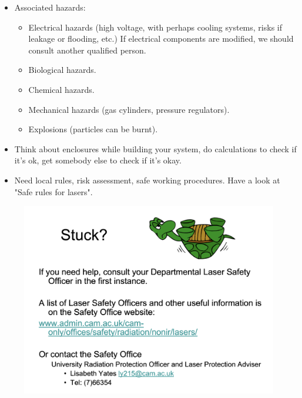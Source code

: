 \documentclass[a4paper,11pt]{article}
\begin{document}
\begin{itemize}
\begin{itemize}
\end{itemize}
\item Associated hazards: 
\begin{itemize}
	\item Electrical hazards (high voltage, with perhaps cooling systems, risks if leakage or flooding, etc.) If electrical components are modified, we should consult another qualified person.
	\item Biological hazards.
	\item Chemical hazards.
	\item Mechanical hazards (gas cylinders, pressure regulators).
	\item Explosions (particles can be burnt).
\end{itemize}
\item Think about enclosures while building your system, do calculations to check if it's ok, get somebody else to check if it's okay.
\item Need local rules, risk assessment, safe working procedures. Have a look at "Safe rules for lasers".
\end{itemize}
\begin{figure}[h]
	\centering
	\includegraphics[width=.8\linewidth]{figures/contact.png}
\end{figure}
\end{document}
